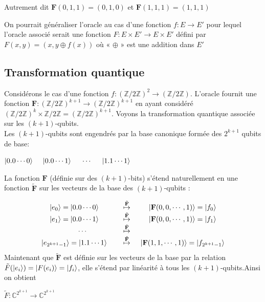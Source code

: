 \documentclass[12pt,openany]{report}
\DeclarePairedDelimiter\ket{\lvert}{\rangle}
\begin{document}
Autrement dit $\mathbf{F}(0, 1, 1) = (0, 1, 0)$ et $ \mathbf{F}(1, 1, 1) = (1, 1, 1)$

On pourrait généraliser l’oracle au cas d’une fonction $f : E \rightarrow E' $
 pour lequel l’oracle associé serait une
fonction $F : E \times  E'
 \rightarrow E \times  E' $
 défini par $F(x, y) = (x, y \oplus  f (x))$ où « $ \oplus $ » est une addition dans $E'$

\subsection{Transformation quantique}
Considérons  le cas d'une fonction $ f:{(\mathbb{Z} / 2\mathbb{Z})}^2  \rightarrow (\mathbb{Z}/2\mathbb{Z})  $. L'oracle fournit une fonction $\mathbf{F}:{(\mathbb{Z}/2\mathbb{Z})}^{k+1}  \rightarrow {(\mathbb{Z}/2\mathbb{Z})}^{k+1} $ en ayant considéré ${(\mathbb{Z}/2\mathbb{Z})}^{k} \times \mathbb{Z}/2\mathbb{Z} ={(\mathbb{Z}/2\mathbb{Z})}^{k+1}$. Voyons la transformation quantique associée sur les $(k+1)$-qubits.\\
Les $(k+1)$-qubits sont engendrés par la base canonique formée des $2^{k+1}$ qubits de base:
\begin{center}
$ \ket{0.0\cdots 0}\hspace{0.5 cm} \ket{0.0\cdots 1}\hspace{0.5 cm} \cdots \hspace{0.5 cm} \ket{1.1\cdots 1} $
\end{center}
La fonction $\mathbf{F} $ (définie sur des $(k+1) $-bits) s'étend naturellement en une fonction $\tilde{\mathbf{F}}$ sur les vecteurs de la base des $(k+1)$-qubits :



\[  
 \left.
\begin{array}{ c @{\overset{\tilde{\mathbf{F}}}{\mapsto}}  c }
\ket{e_0}=\ket{0.0\cdots 0}\hspace{0.8cm} & \hspace{0.5cm}\ket{\mathbf{F}(0,0,\cdots,1)}=\ket{f_0}\\
\ket{e_1}=\ket{0.0\cdots 1}\hspace{0.8cm} & \hspace{0.5cm}\ket{\mathbf{F}(0,0,\cdots,1)}=\ket{f_1}\\
\cdots \\
\ket{e_{2^{k+1}-1}}=\ket{1.1\cdots 1}\hspace{0.8cm} & \hspace{0.5cm}\ket{\mathbf{F}(1,1,\cdots,1)}=\ket{f_{2^{k+1}-1}}\\
\end{array}
\right.
\]
Maintenant que $\tilde{\mathbf{F}} $ est définie sur les vecteurs de la base par la relation $ \tilde{F}(\ket{e_i})=\ket{F(e_i)}=\ket{f_i}  $, elle s'étend par linéarité à tous les $(k+1) $-qubits.Ainsi on obtient
\begin{center}
$ \tilde{F}:\mathbb{C}^{2^{k+1}} \rightarrow \mathbb{C}^{2^{k+1}}  $
\end{center}
\end{document}
